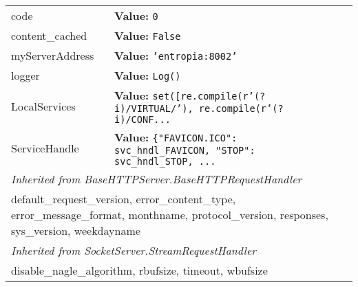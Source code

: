 \begin{longtable}{|p{\varnamewidth}|p{\vardescrwidth}|l}
\cline{1-2}
\raggedright c\-o\-d\-e\- & \raggedright \textbf{Value:} 
{\tt 0}&\\
\cline{1-2}
\raggedright c\-o\-n\-t\-e\-n\-t\-\_\-c\-a\-c\-h\-e\-d\- & \raggedright \textbf{Value:} 
{\tt False}&\\
\cline{1-2}
\raggedright m\-y\-S\-e\-r\-v\-e\-r\-A\-d\-d\-r\-e\-s\-s\- & \raggedright \textbf{Value:} 
{\tt \texttt{'}\texttt{entropia:8002}\texttt{'}}&\\
\cline{1-2}
\raggedright l\-o\-g\-g\-e\-r\- & \raggedright \textbf{Value:} 
{\tt Log()}&\\
\cline{1-2}
\raggedright L\-o\-c\-a\-l\-S\-e\-r\-v\-i\-c\-e\-s\- & \raggedright \textbf{Value:} 
{\tt \texttt{set([}re.compile(r'\texttt{(?i)}/VIRTUAL/')\texttt{, }re.compile(r'\texttt{(?i)}/CONF\texttt{...}}&\\
\cline{1-2}
\raggedright S\-e\-r\-v\-i\-c\-e\-H\-a\-n\-d\-l\-e\- & \raggedright \textbf{Value:} 
{\tt \{"FAVICON.ICO": svc\_hndl\_FAVICON, "STOP": svc\_hndl\_STOP, \texttt{...}}&\\
\cline{1-2}
\multicolumn{2}{|l|}{\textit{Inherited from BaseHTTPServer.BaseHTTPRequestHandler}}\\
\multicolumn{2}{|p{\varwidth}|}{\raggedright default\_request\_version, error\_content\_type, error\_message\_format, monthname, protocol\_version, responses, sys\_version, weekdayname}\\
\cline{1-2}
\multicolumn{2}{|l|}{\textit{Inherited from SocketServer.StreamRequestHandler}}\\
\multicolumn{2}{|p{\varwidth}|}{\raggedright disable\_nagle\_algorithm, rbufsize, timeout, wbufsize}\\
\cline{1-2}
\end{longtable}

